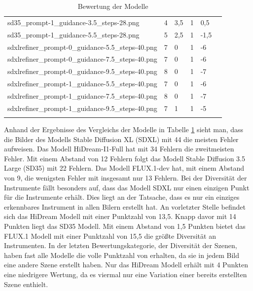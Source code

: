\begin{table}[]
{\begin{tabular}{llllll}
        sd35\_prompt-1\_guidance-3.5\_steps-28.png & 4 & 3,5 & 1 & 0,5 \\ \addlinespace
        sd35\_prompt-1\_guidance-5.5\_steps-28.png & 5 & 2,5 & 1 & -1,5 \\ \addlinespace
        sdxlrefiner\_prompt-0\_guidance-5.5\_steps-40.png & 7 & 0 & 1 & -6 \\ \addlinespace
        sdxlrefiner\_prompt-0\_guidance-7.5\_steps-40.png & 7 & 0 & 1 & -6 \\ \addlinespace
        sdxlrefiner\_prompt-0\_guidance-9.5\_steps-40.png & 8 & 0 & 1 & -7 \\ \addlinespace
        sdxlrefiner\_prompt-1\_guidance-5.5\_steps-40.png & 7 & 0 & 1 & -6 \\ \addlinespace
        sdxlrefiner\_prompt-1\_guidance-7.5\_steps-40.png & 8 & 0 & 1 & -7 \\ \addlinespace
        sdxlrefiner\_prompt-1\_guidance-9.5\_steps-40.png & 7 & 1 & 1 & -5 \\ \addlinespace
        \bottomrule
        \end{tabular}
    }
    \caption{Bewertung der Modelle}
    \label{modelevaluationresults}
\end{table}

Anhand der Ergebnisse des Vergleichs der Modelle in Tabelle \ref{modelevaluationresults} sieht man, dass die Bilder des Modells Stable Diffusion XL (SDXL) mit 44 die meisten Fehler aufweisen. Das Modell HiDream-I1-Full hat mit 34 Fehlern die zweitmeisten Fehler. Mit einem Abstand von 12 Fehlern folgt das Modell Stable Diffusion 3.5 Large (SD35) mit 22 Fehlern. Das Modell FLUX.1-dev hat, mit einem Abstand von 9, die wenigsten Fehler mit insgesamt nur 13 Fehlern.
Bei der Diversität der Instrumente fällt besonders auf, dass das Modell SDXL nur einen einzigen Punkt für die Instrumente erhält. Dies liegt an der Tatsache, dass es nur ein einziges erkennbares Instrument in allen Bilern erstellt hat. An vorletzter Stelle befindet sich das HiDream Modell mit einer Punktzahl von 13,5. Knapp davor mit 14 Punkten liegt das SD35 Modell. Mit einem Abstand von 1,5 Punkten bietet das FLUX.1 Modell mit einer Punktzahl von 15,5 die größte Diversität an Instrumenten.
In der letzten Bewertungskategorie, der Diversität der Szenen, haben fast alle Modelle die volle Punktzahl von erhalten, da sie in jedem Bild eine andere Szene erstellt haben. Nur das HiDream Modell erhält mit 4 Punkten eine niedrigere Wertung, da es viermal nur eine Variation einer bereits erstellten Szene enthielt.

